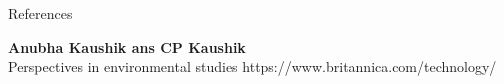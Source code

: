 \documentclass[final]{beamer}
\newlength{\onecolwid}
\begin{document}
\begin{frame}
\begin{columns}[t]
\begin{column}{\onecolwid}


\begin{exampleblock}{References}


\begin{thebibliography}{2}
\bibitem{} \textbf{Anubha Kaushik ans CP Kaushik}\\ Perspectives in environmental studies
\bibitem{} https://www.britannica.com/technology/

\end{thebibliography}
\end{exampleblock}








    
    

\end{column}
\end{columns}
\end{frame}
\end{document}
